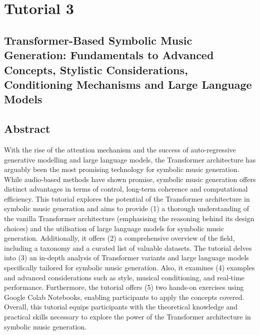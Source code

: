 \clearpage


\section*{Tutorial 3}
{}
%
\subsection*{Transformer-Based Symbolic Music Generation: Fundamentals to Advanced Concepts, Stylistic Considerations, Conditioning Mechanisms and Large Language Models}

\subsection*{Abstract}
With the rise of the attention mechanism and the success of auto-regressive generative modelling and large language models, the Transformer architecture has arguably been the most promising technology for symbolic music generation. While audio-based methods have shown promise, symbolic music generation offers distinct advantages in terms of control, long-term coherence and computational efficiency. This tutorial explores the potential of the Transformer architecture in symbolic music generation and aims to provide (1) a thorough understanding of the vanilla Transformer architecture (emphasising the reasoning behind its design choices) and the utilisation of large language models for symbolic music generation. Additionally, it offers (2) a comprehensive overview of the field, including a taxonomy and a curated list of valuable datasets. The tutorial delves into (3) an in-depth analysis of Transformer variants and large language models specifically tailored for symbolic music generation. Also, it examines (4) examples and advanced considerations such as style, musical conditioning, and real-time performance. Furthermore, the tutorial offers (5) two hands-on exercises using Google Colab Notebooks, enabling participants to apply the concepts covered. Overall, this tutorial equips participants with the theoretical knowledge and practical skills necessary to explore the power of the Transformer architecture in symbolic music generation.

